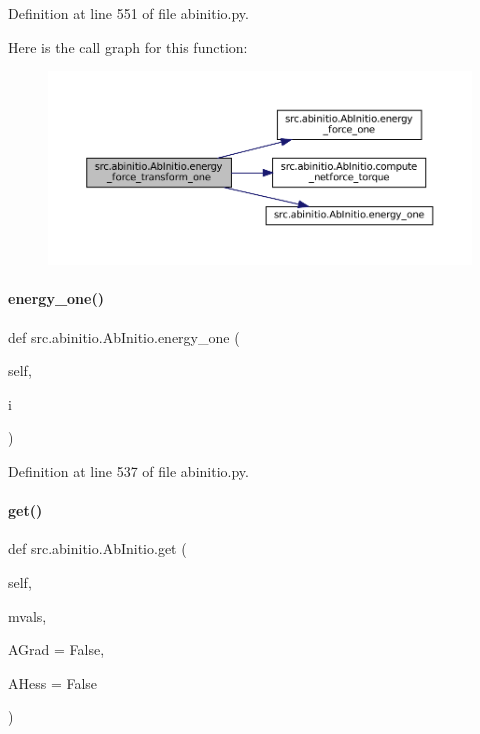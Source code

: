 Definition at line 551 of file abinitio.\+py.

Here is the call graph for this function\+:
\nopagebreak
\begin{figure}[H]
\begin{center}
\leavevmode
\includegraphics[width=350pt]{classsrc_1_1abinitio_1_1AbInitio_a21993fd11a62021d9aa0fe1f4eecd4ad_cgraph}
\end{center}
\end{figure}
\mbox{\label{classsrc_1_1abinitio_1_1AbInitio_a49f95a1162a42d38a96c8484006d7052}} 
\paragraph{\texorpdfstring{energy\+\_\+one()}{energy\_one()}}
{\footnotesize\ttfamily def src.\+abinitio.\+Ab\+Initio.\+energy\+\_\+one (\begin{DoxyParamCaption}\item[{}]{self,  }\item[{}]{i }\end{DoxyParamCaption})}



Definition at line 537 of file abinitio.\+py.

\mbox{\label{classsrc_1_1abinitio_1_1AbInitio_a6a5f66c36e73c1ae24f60c042583c71f}} 
\paragraph{\texorpdfstring{get()}{get()}}
{\footnotesize\ttfamily def src.\+abinitio.\+Ab\+Initio.\+get (\begin{DoxyParamCaption}\item[{}]{self,  }\item[{}]{mvals,  }\item[{}]{A\+Grad = {\ttfamily False},  }\item[{}]{A\+Hess = {\ttfamily False} }\end{DoxyParamCaption})}



